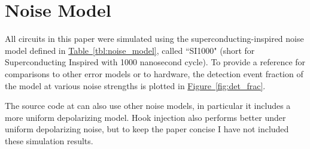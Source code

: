 \documentclass[onecolumn,unpublished,a4paper]{quantumarticle}
\theoremstyle{definition}
\theoremstyle{definition}
\theoremstyle{definition}
\newcommand{\fig}[1]{\hyperref[fig:#1]{Figure~\ref*{fig:#1}}}
\newcommand{\tbl}[1]{\hyperref[tbl:#1]{Table~\ref*{tbl:#1}}}
\begin{document}
\printbibliography

\appendix

\section{Noise Model}
\label{app:noise_model}

All circuits in this paper were simulated using the superconducting-inspired noise model defined in \tbl{noise_model}, called ``SI1000" (short for Superconducting Inspired with 1000 nanosecond cycle).
To provide a reference for comparisons to other error models or to hardware, the detection event fraction of the model at various noise strengths is plotted in \fig{det_frac}.

The source code at \cite{gidneyhookdata2023} can also use other noise models, in particular it includes a more uniform depolarizing model.
Hook injection also performs better under uniform depolarizing noise, but to keep the paper concise I have not included these simulation results.
\end{document}
